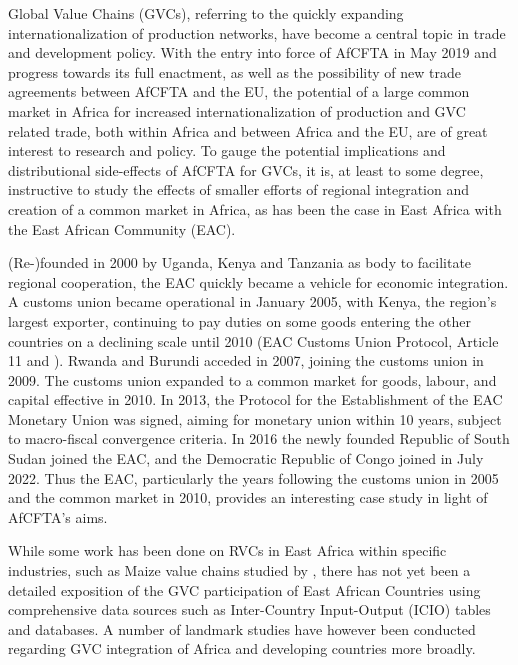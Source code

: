 \documentclass[a4paper]{article}
\begin{document}
Global Value Chains (GVCs), referring to the quickly expanding internationalization of production networks, have become a central topic in trade and development policy. With the entry into force of AfCFTA in May 2019 and progress towards its full enactment, as well as the possibility of new trade agreements between AfCFTA and the EU, the potential of a large common market in Africa for increased internationalization of production and GVC related trade, both within Africa and between Africa and the EU, are of great interest to research and policy. To gauge the potential implications and distributional side-effects of AfCFTA for GVCs, it is, at least to some degree, instructive to study the effects of smaller efforts of regional integration and creation of a common market in Africa, as has been the case in East Africa with the East African Community (EAC). \newline 

(Re-)founded in 2000 by Uganda, Kenya and Tanzania as body to facilitate regional cooperation, the EAC quickly became a vehicle for economic integration. A customs union became operational in January 2005, with Kenya, the region's largest exporter, continuing to pay duties on some goods entering the other countries on a declining scale until 2010 (EAC Customs Union Protocol, Article 11 and \citet{aloo2017free}). Rwanda and Burundi acceded in 2007, joining the customs union in 2009. The customs union expanded to a common market for goods, labour, and capital effective in 2010. In 2013, the Protocol for the Establishment of the EAC Monetary Union was signed, aiming for monetary union within 10 years, subject to macro-fiscal convergence criteria. In 2016 the newly founded Republic of South Sudan joined the EAC, and the Democratic Republic of Congo joined in July 2022. Thus the EAC, particularly the years following the customs union in 2005 and the common market in 2010, provides an interesting case study in light of AfCFTA's aims. \newline %


While some work has been done on RVCs in East Africa within specific industries, such as Maize value chains studied by \citet{daly2016maize}, there has not yet been a detailed exposition of the GVC participation of East African Countries using comprehensive data sources such as Inter-Country Input-Output (ICIO) tables and databases. A number of landmark studies have however been conducted regarding GVC integration of Africa and developing countries more broadly. \newline
\end{document}
